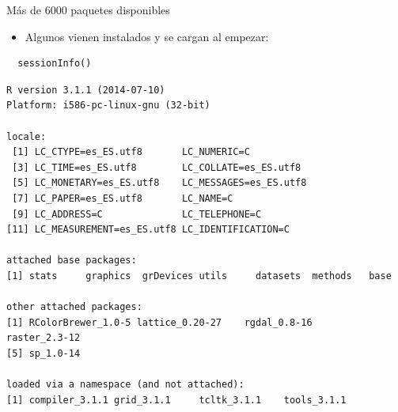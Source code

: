 \documentclass[xcolor={usenames,svgnames,dvipsnames}]{beamer}
\begin{document}
\begin{frame}[fragile,label=sec-1-3-3]{Más de 6000 paquetes disponibles}
 \begin{itemize}
\item Algunos vienen instalados y se cargan al empezar:
\end{itemize}
\lstset{language=R,label= ,caption= ,numbers=none}
\begin{lstlisting}
  sessionInfo()
\end{lstlisting}

\begin{verbatim}
R version 3.1.1 (2014-07-10)
Platform: i586-pc-linux-gnu (32-bit)

locale:
 [1] LC_CTYPE=es_ES.utf8       LC_NUMERIC=C             
 [3] LC_TIME=es_ES.utf8        LC_COLLATE=es_ES.utf8    
 [5] LC_MONETARY=es_ES.utf8    LC_MESSAGES=es_ES.utf8   
 [7] LC_PAPER=es_ES.utf8       LC_NAME=C                
 [9] LC_ADDRESS=C              LC_TELEPHONE=C           
[11] LC_MEASUREMENT=es_ES.utf8 LC_IDENTIFICATION=C      

attached base packages:
[1] stats     graphics  grDevices utils     datasets  methods   base     

other attached packages:
[1] RColorBrewer_1.0-5 lattice_0.20-27    rgdal_0.8-16       raster_2.3-12     
[5] sp_1.0-14         

loaded via a namespace (and not attached):
[1] compiler_3.1.1 grid_3.1.1     tcltk_3.1.1    tools_3.1.1
\end{verbatim}
\end{frame}
\end{document}
